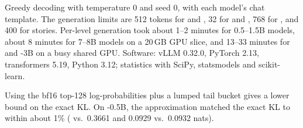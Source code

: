  Greedy decoding with temperature 0 and seed 0, with each model's chat template. The generation limits are 512 tokens for \gsm and \humaneval, 32 for \trivia and \squad, 768 for \ifeval, and 400 for stories. Per-level generation took about 1--2 minutes for 0.5--1.5B models, about 8 minutes for 7--8B models on a 20\,GB GPU slice, and 13--33 minutes for \phithree and \qwen-3B on a busy shared GPU. Software: vLLM 0.32.0, PyTorch 2.13, transformers 5.19, Python 3.12; statistics with SciPy, statsmodels and scikit-learn.

 Using the bf16 top-128 log-probabilities plus a lumped tail bucket gives a lower bound on the exact KL. On \qwen-0.5B, the approximation matched the exact KL to within about 1\% ( vs.\ 0.3661 and 0.0929 vs.\ 0.0932 nats).
